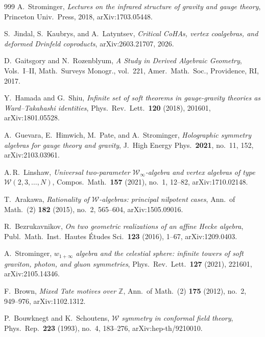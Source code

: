 \documentclass[11pt]{memoir}
\begin{document}
\begin{thebibliography}{999}
A.~Strominger, \emph{Lectures on the infrared structure of gravity and gauge theory}, Princeton Univ.\ Press, 2018, arXiv:1703.05448.

S.~Jindal, S.~Kaubrys, and A.~Latyntsev, \emph{Critical CoHAs, vertex coalgebras, and deformed Drinfeld coproducts}, arXiv:2603.21707, 2026.

D.~Gaitsgory and N.~Rozenblyum, \emph{A Study in Derived Algebraic Geometry}, Vols.~I--II, Math.\ Surveys Monogr., vol.~221, Amer.\ Math.\ Soc., Providence, RI, 2017.


Y.~Hamada and G.~Shiu, \emph{Infinite set of soft theorems in gauge-gravity theories as Ward--Takahashi identities}, Phys.\ Rev.\ Lett.\ \textbf{120} (2018), 201601, arXiv:1801.05528.

A.~Guevara, E.~Himwich, M.~Pate, and A.~Strominger, \emph{Holographic symmetry algebras for gauge theory and gravity}, J.\ High Energy Phys.\ \textbf{2021}, no.~11, 152, arXiv:2103.03961.

A.\,R.~Linshaw, \emph{Universal two-parameter $\mathcal{W}_\infty$-algebra and vertex algebras of type $\mathcal{W}(2,3,\ldots,N)$}, Compos.\ Math.\ \textbf{157} (2021), no.~1, 12--82, arXiv:1710.02148.

T.~Arakawa, \emph{Rationality of $\mathcal{W}$-algebras: principal nilpotent cases}, Ann.\ of Math.~(2) \textbf{182} (2015), no.~2, 565--604, arXiv:1505.09016.

R.~Bezrukavnikov, \emph{On two geometric realizations of an affine Hecke algebra}, Publ.\ Math.\ Inst.\ Hautes \'Etudes Sci.\ \textbf{123} (2016), 1--67, arXiv:1209.0403.

A.~Strominger, \emph{$w_{1+\infty}$ algebra and the celestial sphere: infinite towers of soft graviton, photon, and gluon symmetries}, Phys.\ Rev.\ Lett.\ \textbf{127} (2021), 221601, arXiv:2105.14346.

F.~Brown, \emph{Mixed Tate motives over $\mathbb{Z}$}, Ann.\ of Math.~(2) \textbf{175} (2012), no.~2, 949--976, arXiv:1102.1312.

P.~Bouwknegt and K.~Schoutens, \emph{$\mathcal{W}$ symmetry in conformal field theory}, Phys.\ Rep.\ \textbf{223} (1993), no.~4, 183--276, arXiv:hep-th/9210010.


\end{thebibliography}
\end{document}
